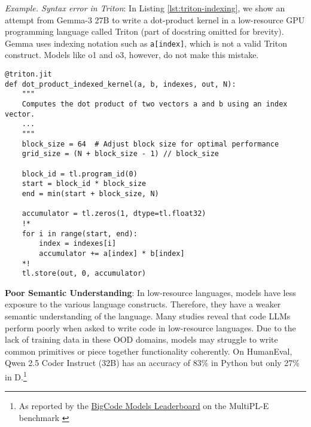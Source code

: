 \begin{tcolorbox}[colback=lightblue, boxrule=0pt, arc=5pt, outer arc=5pt, after skip=10pt plus 2pt]

\textit{Example. Syntax error in Triton}: In Listing \ref{lst:triton-indexing}, we show an attempt from Gemma-3 27B to write a dot-product kernel in a low-resource GPU programming language called Triton (part of docstring omitted for brevity). Gemma uses indexing notation such as \texttt{a[index]}, which is not a valid Triton construct. Models like o1 and o3, however, do not make this mistake.

\begin{lstlisting}[label={lst:triton-indexing}, captionpos=t, breaklines=true, language=triton]
@triton.jit
def dot_product_indexed_kernel(a, b, indexes, out, N):
    """
    Computes the dot product of two vectors a and b using an index vector.
    ...
    """
    block_size = 64  # Adjust block size for optimal performance
    grid_size = (N + block_size - 1) // block_size

    block_id = tl.program_id(0)
    start = block_id * block_size
    end = min(start + block_size, N)

    accumulator = tl.zeros(1, dtype=tl.float32)
    !*
    for i in range(start, end):
        index = indexes[i]
        accumulator += a[index] * b[index]
    *!
    tl.store(out, 0, accumulator)
\end{lstlisting}
\end{tcolorbox}

\textbf{Poor Semantic Understanding}: In low-resource languages, models have less exposure to the various language constructs. Therefore, they have a weaker semantic understanding of the language. Many studies reveal that code LLMs perform poorly when asked to write code in low-resource languages. Due to the lack of training data in these OOD domains, models may struggle to write common primitives or piece together functionality coherently. On HumanEval, Qwen 2.5 Coder Instruct (32B) \citep{hui2024qwen2} has an accuracy of 83\% in Python but only 27\% in D.\footnote{As reported by the \href{https://huggingface.co/spaces/bigcode/bigcode-models-leaderboard}{BigCode Models Leaderboard} on the MultiPL-E benchmark \citep{cassano2023multipl}}


